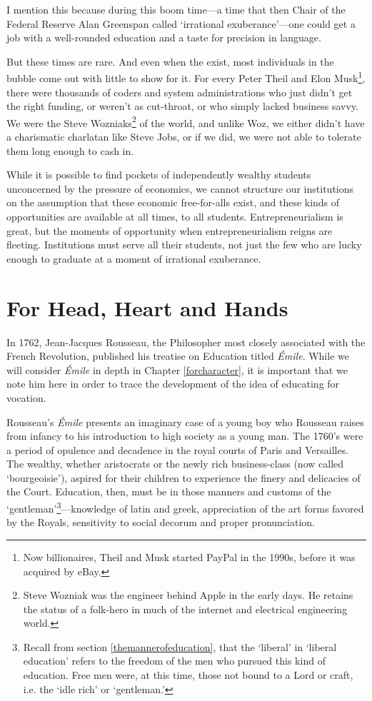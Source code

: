 I mention this because during this boom time---a time that then Chair of the Federal Reserve Alan Greenspan called `irrational exuberance'---one could get a job with a well-rounded education and a taste for precision in language. 

But these times are rare. And even when the exist, most individuals in the bubble come out with little to show for it. For every Peter Theil and Elon Musk\footnote{Now billionaires, Theil and Musk started PayPal in the 1990s, before it was acquired by eBay.}, there were thousands of coders and system administrations who just didn't get the right funding, or weren't as cut-throat, or who simply lacked business savvy. We were the Steve Wozniaks\footnote{Steve Wozniak was the engineer behind Apple in the early days. He retains the status of a folk-hero in much of the internet and electrical engineering world.} of the world, and unlike Woz, we either didn't have a charismatic charlatan like Steve Jobs, or if we did, we were not able to tolerate them long enough to cash in.

While it is possible to find pockets of independently wealthy students unconcerned by the pressure of economics, we cannot structure our institutions on the assumption that these economic free-for-alls exist, and these kinds of opportunities are available at all times, to all students. Entrepreneurialism is great, but the moments of opportunity when entrepreneurialism reigns are fleeting. Institutions must serve all their students, not just the few who are lucky enough to graduate at a moment of irrational exuberance.

\section{For Head, Heart and Hands}
\label{forheadheartandhands}

In 1762, Jean-Jacques Rousseau, the Philosopher most closely associated with the French Revolution, published his treatise on Education titled \emph{Émile}. While we will consider \emph{Émile} in depth in Chapter \ref{forcharacter}, it is important that we note him here in order to trace the development of the idea of educating for vocation.

Rousseau's \emph{Émile} presents an imaginary case of a young boy who Rousseau raises from infancy to his introduction to high society as a young man. The 1760's were a period of opulence and decadence in the royal courts of Paris and Versailles. The wealthy, whether aristocrats or the newly rich business-class (now called `bourgeoisie'), aspired for their children to experience the finery and delicacies of the Court. Education, then, must be in those manners and customs of the `gentleman'\footnote{Recall from section \ref{themannerofeducation}, that the `liberal' in `liberal education' refers to the freedom of the men who pursued this kind of education. Free men were, at this time, those not bound to a Lord or craft, i.e. the `idle rich' or `gentleman.'}---knowledge of latin and greek, appreciation of the art forms favored by the Royals, sensitivity to social decorum and proper pronunciation.

